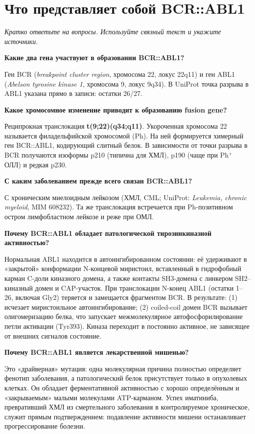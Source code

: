 \documentclass[11pt,a4paper]{article}
\newcommand{\code}[1]{{\ttfamily #1}}
\newcommand{\instr}[1]{{\small\itshape #1\par}}
\begin{document}
\section{Что представляет собой BCR::ABL1}
\instr{Кратко ответьте на вопросы. Используйте связный текст и укажите источники.}

\textbf{Какие два гена участвуют в образовании BCR::ABL1?}

Ген \code{BCR} (\emph{breakpoint cluster region}, хромосома 22, локус 22q11) и ген
\code{ABL1} (\emph{Abelson tyrosine kinase 1}, хромосома 9, локус 9q34). В UniProt точка
разрыва в ABL1 указана прямо в записи: остатки 26/27.

\textbf{Какое хромосомное изменение приводит к образованию fusion gene?}

Реципрокная транслокация \textbf{t(9;22)(q34;q11)}. Укороченная хромосома 22 называется
филадельфийской хромосомой (Ph). На ней формируется химерный ген \code{BCR::ABL1},
кодирующий слитный белок. В зависимости от точки разрыва в BCR получаются изоформы p210
(типична для ХМЛ), p190 (чаще при Ph$^+$ ОЛЛ) и редкая p230.

\textbf{С каким заболеванием прежде всего связан BCR::ABL1?}

С хроническим миелоидным лейкозом (ХМЛ, CML; UniProt: \emph{Leukemia, chronic myeloid},
MIM 608232). Та же транслокация встречается при Ph-позитивном остром лимфобластном
лейкозе и реже при ОМЛ.

\textbf{Почему BCR::ABL1 обладает патологической тирозинкиназной активностью?}

Нормальная ABL1 находится в автоингибированном состоянии: её удерживают в «закрытой»
конформации N-концевой миристоил, вставленный в гидрофобный карман C-доли киназного
домена, а также контакты SH3-домена с линкером SH2--киназный домен и CAP-участок.
При транслокации N-конец ABL1 (остатки 1--26, включая Gly2) теряется и замещается
фрагментом BCR. В результате: (1) исчезает миристоильное автоингибирование;
(2) coiled-coil домен BCR вызывает олигомеризацию белка, что запускает межмолекулярное
автофосфорилирование петли активации (Tyr393). Киназа переходит в постоянно активное,
не зависящее от внешних сигналов состояние.

\textbf{Почему BCR::ABL1 является лекарственной мишенью?}

Это «драйверная» мутация: одна молекулярная причина полностью определяет фенотип
заболевания, а патологический белок присутствует только в опухолевых клетках. Он
обладает ферментативной активностью с хорошо определённым и «закрываемым» малыми
молекулами ATP-карманом. Успех иматиниба, превративший ХМЛ из смертельного заболевания
в контролируемое хроническое, служит прямым подтверждением: подавление активности
мишени останавливает прогрессирование болезни.
\end{document}
